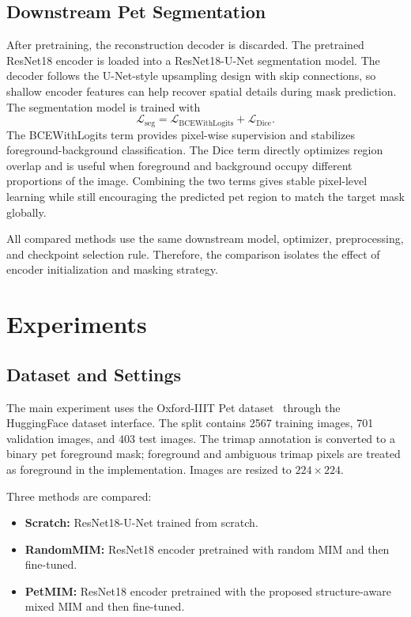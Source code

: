 \documentclass[11pt]{article}
\begin{document}
\subsection{Downstream Pet Segmentation}

After pretraining, the reconstruction decoder is discarded. The pretrained ResNet18 encoder is loaded into a ResNet18-U-Net segmentation model. The decoder follows the U-Net-style upsampling design with skip connections, so shallow encoder features can help recover spatial details during mask prediction. The segmentation model is trained with
\begin{equation}
\mathcal{L}_{\mathrm{seg}}
=
\mathcal{L}_{\mathrm{BCEWithLogits}}
+
\mathcal{L}_{\mathrm{Dice}}.
\label{eq:seg_loss}
\end{equation}
The BCEWithLogits term provides pixel-wise supervision and stabilizes foreground-background classification. The Dice term directly optimizes region overlap and is useful when foreground and background occupy different proportions of the image. Combining the two terms gives stable pixel-level learning while still encouraging the predicted pet region to match the target mask globally.

All compared methods use the same downstream model, optimizer, preprocessing, and checkpoint selection rule. Therefore, the comparison isolates the effect of encoder initialization and masking strategy.

\section{Experiments}

\subsection{Dataset and Settings}

The main experiment uses the Oxford-IIIT Pet dataset~\cite{parkhi2012cats} through the HuggingFace dataset interface. The split contains 2567 training images, 701 validation images, and 403 test images. The trimap annotation is converted to a binary pet foreground mask; foreground and ambiguous trimap pixels are treated as foreground in the implementation. Images are resized to $224 \times 224$.

Three methods are compared:
\begin{itemize}
    \item \textbf{Scratch:} ResNet18-U-Net trained from scratch.
    \item \textbf{RandomMIM:} ResNet18 encoder pretrained with random MIM and then fine-tuned.
    \item \textbf{PetMIM:} ResNet18 encoder pretrained with the proposed structure-aware mixed MIM and then fine-tuned.
\end{itemize}
\end{document}
